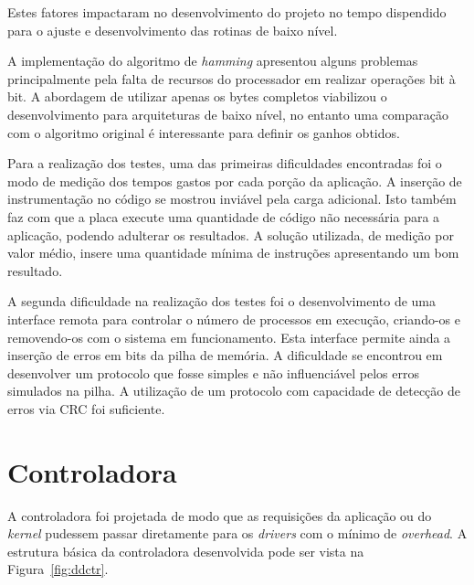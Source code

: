 \documentclass[12pt,openright,oneside,a4paper,brazil]{abntex2}
\begin{document}
Estes fatores impactaram no desenvolvimento do projeto no tempo dispendido para o ajuste e desenvolvimento das rotinas de baixo nível.

A implementação do algoritmo de \textit{hamming} apresentou alguns problemas principalmente pela falta de recursos do processador em realizar operações bit à bit. A abordagem de utilizar apenas os bytes completos viabilizou o desenvolvimento para arquiteturas de baixo nível, no entanto uma comparação com o algoritmo original é interessante para definir os ganhos obtidos.

Para a realização dos testes, uma das primeiras dificuldades encontradas foi o modo de medição dos tempos gastos por cada porção da aplicação. A inserção de instrumentação no código se mostrou inviável pela carga adicional. Isto também faz com que a placa execute uma quantidade de código não necessária para a aplicação, podendo adulterar os resultados. A solução utilizada, de medição por valor médio, insere uma quantidade mínima de instruções apresentando um bom resultado.

A segunda dificuldade na realização dos testes foi o desenvolvimento de uma interface remota para controlar o número de processos em execução, criando-os e removendo-os com o sistema em funcionamento. Esta interface permite ainda a inserção de erros em bits da pilha de memória. A dificuldade se encontrou em desenvolver um protocolo que fosse simples e não influenciável pelos erros simulados na pilha. A utilização de um protocolo com capacidade de detecção de erros via CRC foi suficiente. 


\postextual



\apendices

\anexos

\chapter{Controladora}\label{chap:controladora}
A controladora foi projetada de modo que as requisições da aplicação ou do \textit{kernel} pudessem passar diretamente para os \textit{drivers} com o mínimo de \textit{overhead}. A estrutura básica da controladora desenvolvida pode ser vista na Figura~\ref{fig:ddctr}.
\end{document}
